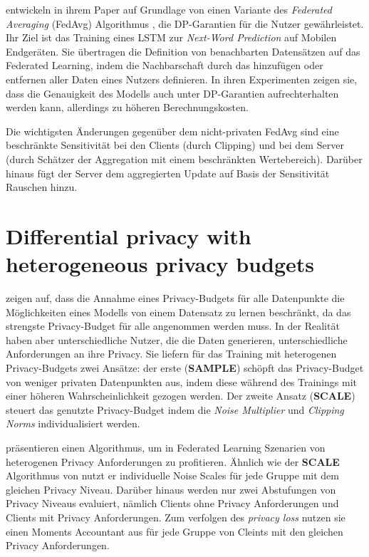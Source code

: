 \textcite{mcmahan:2018} entwickeln in ihrem Paper auf Grundlage von \textcite{abadi:2016} einen Variante des \textit{Federated Averaging} (FedAvg) Algorithmus \parencite{mcmahan:2016}, die DP-Garantien für die Nutzer gewährleistet. Ihr Ziel ist das Training eines LSTM zur \textit{Next-Word Prediction} auf Mobilen Endgeräten. Sie übertragen die Definition von benachbarten Datensätzen auf das Federated Learning, indem die Nachbarschaft durch das hinzufügen oder entfernen aller Daten eines Nutzers definieren. In ihren Experimenten zeigen sie, dass die Genauigkeit des Modells auch unter DP-Garantien aufrechterhalten werden kann, allerdings zu höheren Berechnungskosten.

Die wichtigsten Änderungen gegenüber dem nicht-privaten FedAvg sind eine beschränkte Sensitivität bei den Clients (durch Clipping) und bei dem Server (durch Schätzer der Aggregation mit einem beschränkten Wertebereich). Darüber hinaus fügt der Server dem aggregierten Update auf Basis der Sensitivität Rauschen hinzu.

\section{Differential privacy with heterogeneous privacy budgets}

\textcite{boenisch:2023} zeigen auf, dass die Annahme eines Privacy-Budgets für alle Datenpunkte die Möglichkeiten eines Modells von einem Datensatz zu lernen beschränkt, da das strengste Privacy-Budget für alle angenommen werden muss. In der Realität haben aber unterschiedliche Nutzer, die die Daten generieren, unterschiedliche Anforderungen an ihre Privacy. Sie liefern für das Training mit heterogenen Privacy-Budgets zwei Ansätze: der erste (\textbf{SAMPLE}) schöpft das Privacy-Budget von weniger privaten Datenpunkten aus, indem diese während des Trainings mit einer höheren Wahrscheinlichkeit gezogen werden. Der zweite Ansatz (\textbf{SCALE}) steuert das genutzte Privacy-Budget indem die \textit{Noise Multiplier} und \textit{Clipping Norms} individualisiert werden.

\textcite{aldaghri:2023} präsentieren einen Algorithmus, um in Federated Learning Szenarien von heterogenen Privacy Anforderungen zu profitieren. Ähnlich wie der \textbf{SCALE} Algorithmus von \textcite{boenisch:2023} nutzt er individuelle Noise Scales für jede Gruppe mit dem gleichen Privacy Niveau. Darüber hinaus werden nur zwei Abstufungen von Privacy Niveaus evaluiert, nämlich Clients ohne Privacy Anforderungen und Clients mit Privacy Anforderungen. Zum verfolgen des \textit{privacy loss} nutzen sie einen Moments Accountant aus \textcite{abadi:2016} für jede Gruppe von Cleints mit den gleichen Privacy Anforderungen.

